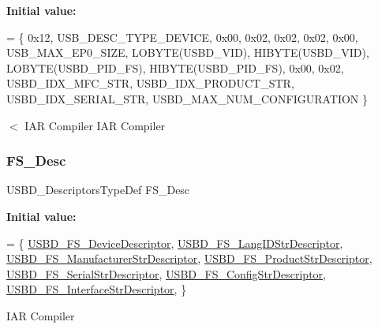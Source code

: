 {\bfseries Initial value\+:}
\begin{DoxyCode}
=
  \{
    0x12,                       
    USB\_DESC\_TYPE\_DEVICE,       
    0x00,                         
    0x02,
    0x02,                        
    0x02,                       
    0x00,                       
    USB\_MAX\_EP0\_SIZE,          
    LOBYTE(USBD\_VID),           
    HIBYTE(USBD\_VID),           
    LOBYTE(USBD\_PID\_FS),           
    HIBYTE(USBD\_PID\_FS),           
    0x00,                       
    0x02,
    USBD\_IDX\_MFC\_STR,           
    USBD\_IDX\_PRODUCT\_STR,       
    USBD\_IDX\_SERIAL\_STR,        
    USBD\_MAX\_NUM\_CONFIGURATION  
  \}
\end{DoxyCode}
$<$ I\+AR Compiler I\+AR Compiler \hypertarget{group___u_s_b_d___d_e_s_c___private___variables_gae36d67393118d9d8531a8d633e23a797}{}\label{group___u_s_b_d___d_e_s_c___private___variables_gae36d67393118d9d8531a8d633e23a797} 
\subsubsection{\texorpdfstring{F\+S\+\_\+\+Desc}{FS\_Desc}}
{\footnotesize\ttfamily U\+S\+B\+D\+\_\+\+Descriptors\+Type\+Def F\+S\+\_\+\+Desc}

{\bfseries Initial value\+:}
\begin{DoxyCode}
=
\{
  \hyperlink{group___u_s_b_d___d_e_s_c___private___functions_ga14798be38c08a37163e53167032485ff}{USBD\_FS\_DeviceDescriptor},
  \hyperlink{group___u_s_b_d___d_e_s_c___private___functions_gac02628ceb6a6a071e192dcb85063c0cc}{USBD\_FS\_LangIDStrDescriptor}, 
  \hyperlink{group___u_s_b_d___d_e_s_c___private___functions_ga6427a671827813efe1a46c3dfcb05683}{USBD\_FS\_ManufacturerStrDescriptor},
  \hyperlink{group___u_s_b_d___d_e_s_c___private___functions_ga0ec558c0303daabb851d584109a56514}{USBD\_FS\_ProductStrDescriptor},
  \hyperlink{group___u_s_b_d___d_e_s_c___private___functions_gaad2a1d1451821845eda602a82b1cd213}{USBD\_FS\_SerialStrDescriptor},
  \hyperlink{group___u_s_b_d___d_e_s_c___private___functions_ga40ed2a0fb60c50a285983a09ba6921d6}{USBD\_FS\_ConfigStrDescriptor},
  \hyperlink{group___u_s_b_d___d_e_s_c___private___functions_gab248f43276f92d982ab5853111e4fb10}{USBD\_FS\_InterfaceStrDescriptor},
\}
\end{DoxyCode}
I\+AR Compiler 